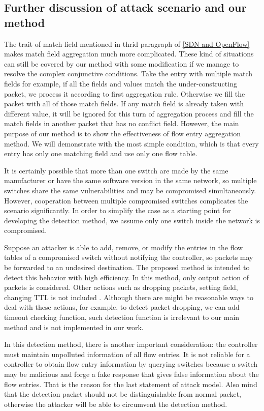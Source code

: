 \subsection{Further discussion of attack scenario and our method}
\label{Further_discussion}

The trait of match field mentioned in thrid paragraph of \ref{SDN and OpenFlow} makes match field aggregation much more complicated. These kind of situations can still be covered by our method with some modification if we manage to resolve the complex conjunctive conditions. Take the entry with multiple match fields for example, if all the fields and values match the under-constructing packet, we process it according to first aggregation rule. Otherwise we fill the packet with all of those match fields. If any match field is already taken with different value, it will be ignored for this turn of aggregation process and fill the match fields in another packet that has no conflict field. However, the main purpose of our method is to show the effectiveness of flow entry aggregation method. We will demonstrate with the most simple condition, which is that every entry has only one matching field and use only one flow table.

It is certainly possible that more than one switch are made by the same manufacturer or have the same software version in the same network, so multiple switches share the same vulnerabilities and may be compromised simultaneously. However, cooperation between multiple compromised switches complicates the scenario significantly. In order to simplify the case as a starting point for developing the detection method, we assume only one switch inside the network is compromised.

Suppose an attacker is able to add, remove, or modify the entries in the flow tables of a compromised
switch without notifying the controller, so packets may be forwarded to an undesired destination. The proposed method is intended to detect this behavior with high efficiency. In this method, only output action of packets is considered. Other actions such as dropping packets, setting field, changing TTL is not included \sout{}. Although there are might be reasonable ways to deal with these actions, for example, to detect packet dropping, we can add timeout checking function, such detection function is irrelevant to our main method and is not implemented in our work.

In this detection method, there is another important consideration: the controller must maintain unpolluted information of all flow entries. It is not reliable for a controller to obtain flow entry information by querying switches because a switch may be malicious and forge a fake response that gives false information about the flow entries. That is the reason for the last statement of attack model. Also mind that the detection packet should not be distinguishable from normal packet, otherwise the attacker will be able to circumvent the detection method. 
